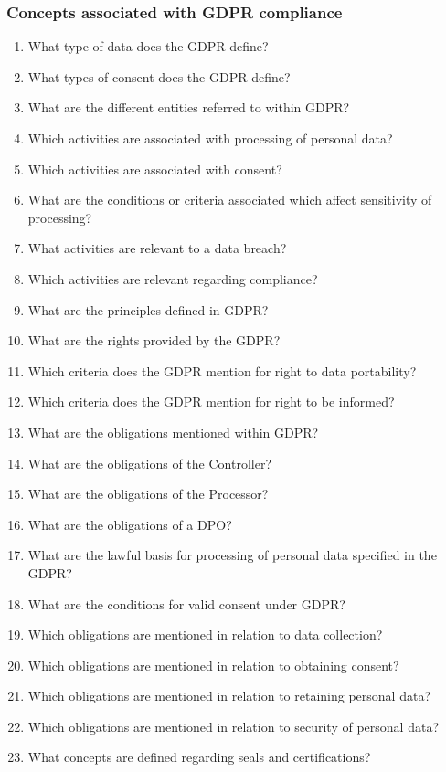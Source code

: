 \subsubsection{Concepts associated with GDPR compliance}
\begin{enumerate}[label={\texttt{CQ.\theenumi}},resume]
    \item What type of data does the GDPR define?
    \item What types of consent does the GDPR define?
    \item What are the different entities referred to within GDPR?
    \item Which activities are associated with processing of personal data?
    \item Which activities are associated with consent?
    \item What are the conditions or criteria associated which affect sensitivity of processing?
    \item What activities are relevant to a data breach?
    \item Which activities are relevant regarding compliance?
    \item What are the principles defined in GDPR?
    \item What are the rights provided by the GDPR?
    \item Which criteria does the GDPR mention for right to data portability?
    \item Which criteria does the GDPR mention for right to be informed?
    \item What are the obligations mentioned within GDPR?
    \item What are the obligations of the Controller?
    \item What are the obligations of the Processor?
    \item What are the obligations of a DPO?
    \item What are the lawful basis for processing of personal data specified in the GDPR?
    \item What are the conditions for valid consent under GDPR?
    \item Which obligations are mentioned in relation to data collection?
    \item Which obligations are mentioned in relation to obtaining consent?
    \item Which obligations are mentioned in relation to retaining personal data?
    \item Which obligations are mentioned in relation to security of personal data?
    \item What concepts are defined regarding seals and certifications?
\end{enumerate}

